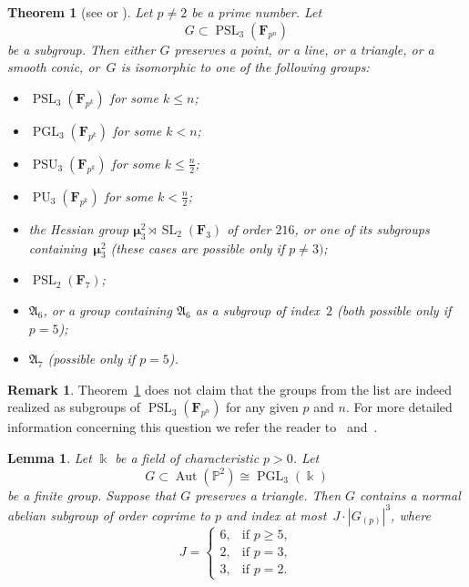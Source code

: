 \documentclass[12pt]{amsart}
\numberwithin{equation}{section}
\newtheorem{lemma}[subsection]{Lemma}
\newtheorem{theorem}[subsection]{Theorem}
\theoremstyle{definition}
\newtheorem{remark}[subsection]{Remark}
\newcommand{\mumu}{\boldsymbol{\mu}}
\newcommand{\PP}{\mathbb P}
\DeclareMathOperator{\Aut}{Aut}
\DeclareMathOperator{\SL}{SL}
\DeclareMathOperator{\PGL}{PGL}
\DeclareMathOperator{\PSL}{PSL}
\DeclareMathOperator{\PU}{PU}
\DeclareMathOperator{\PSU}{PSU}
\def \ge {\geqslant}
\def \le {\leqslant}
\begin{document}
\begin{theorem}[{see \cite{Mitchell} or \cite[Theorem~2.4]{King}}]
\label{theorem:Mitchell}
Let $p\neq 2$ be a prime number.
Let
$$
G\subset \PSL_3(\mathbf{F}_{p^n})
$$
be a subgroup.
Then either $G$ preserves a point, or a line, or a triangle, or a smooth conic, or~$G$ is isomorphic to one of the following groups:
\begin{itemize}
\item[(1)] $\PSL_3(\mathbf{F}_{p^k})$ for some $k\le n$;

\item[(2)] $\PGL_3(\mathbf{F}_{p^k})$ for some $k<n$;

\item[(3)] $\PSU_3(\mathbf{F}_{p^k})$ for some $k\le \frac{n}{2}$;

\item[(4)] $\PU_3(\mathbf{F}_{p^k})$  for some $k<\frac{n}{2}$;

\item[(5)] the Hessian group $\mumu_3^2\rtimes\SL_2(\mathbf{F}_3)$ of order $216$, or one of its subgroups containing~$\mumu_3^2$ (these cases are possible only if $p\neq 3)$;

\item[(6)] $\PSL_2(\mathbf{F}_7)$;

\item[(7)] $\mathfrak{A}_6$, or a group containing $\mathfrak{A}_6$ as a subgroup of index~$2$
(both possible only if $p=5$);

\item[(8)] $\mathfrak{A}_7$ (possible only if $p=5$).
\end{itemize}
\end{theorem}

\begin{remark}
Theorem~\ref{theorem:Mitchell} does not claim that the groups from the list are indeed realized
as subgroups of $\PSL_3(\mathbf{F}_{p^n})$ for any given $p$ and $n$. For more detailed information
concerning this question we refer the reader to~\cite{Mitchell} and~\cite{King}.
\end{remark}

\begin{lemma}\label{lemma:triangle}
Let $\Bbbk$ be a field of characteristic $p>0$.
Let
$$
G\subset \Aut(\PP^2)\cong \PGL_3(\Bbbk)
$$
be a finite group.
Suppose that $G$ preserves a triangle.
Then $G$ contains a normal abelian subgroup
of order coprime
to $p$ and index at most~\mbox{$J\cdot |G_{(p)}|^{3}$},
where
\begin{equation*}%
J=\begin{cases}
6, &\text{if\ } p\ge 5,\\
2, &\text{if\ } p=3,\\
3, &\text{if\ } p=2.
\end{cases}
\end{equation*}
\end{lemma}
\end{document}
